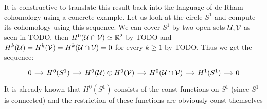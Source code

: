 It is constructive to translate this result back into the language of de Rham cohomology
using a concrete example. Let us look at the circle $S^1$ and compute its cohomology
using this sequence. We can cover $S^1$ by two open sets $\mathcal{U}, \mathcal{V}$ as seen in TODO, then
$H^0(\mathcal{U} \cap \mathcal{V}) \simeq \mathbb{R}^2$ by TODO and $H^k(\mathcal{U}) = H^k(\mathcal{V}) = H^k(\mathcal{U} \cap \mathcal{V}) = 0$ for
every $k \geq 1$ by TODO. Thus we get the sequence:
\[\begin{tikzcd}[column sep=small]
	0 & {H^0(S^1)} & {H^0(\U) \oplus H^0(\V)} & {H^0(\U \cap \V)} & {H^1(S^1)} & 0
	\arrow[from=1-1, to=1-2]
	\arrow[from=1-2, to=1-3]
	\arrow[from=1-3, to=1-4]
	\arrow[from=1-4, to=1-5]
	\arrow[from=1-5, to=1-6]
\end{tikzcd}\]
It is already known that $H^0(S^1)$ consists of the const functions on $S^1$ (since $S^1$
is connected) and the restriction of these functions are obviously const themselves

